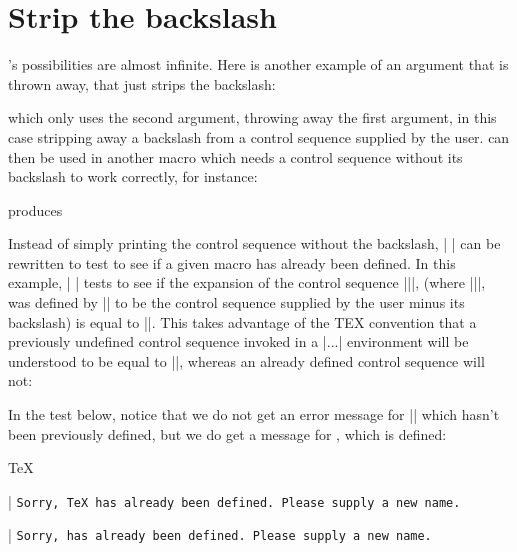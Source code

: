 \section*{Strip the backslash}

\tex's possibilities are almost infinite. Here is another example of
an argument that is thrown away\cite{amy1990}, that just strips the backslash:

\def\stripbackslash#1#2*{\def\one{#2}}

which only uses the second argument, throwing away the
first argument, in this case stripping away a backslash
from a control sequence supplied by the user. 
can then be used in another macro which
needs a control sequence without its backslash to work
correctly, for instance:

\def\newdef#1{\expandafter
\stripbackslash\string#1* \one}



\newdef\testmacro

produces

\newdef\testmacro


Instead of simply printing the control sequence without
the backslash, |\newdef| can be rewritten to test to see
if a given macro has already been defined. In this example,
|\newdef| tests to see if the expansion of the control
sequence |\csname\one\endcsname|, (where |\one|,
was defined by |\stripbackslash| to be the control sequence
supplied by the user minus its backslash) is equal
to |\relax|. This takes advantage of the TEX convention
that a previously undefined control sequence invoked in
a |\csname...\endcsname| environment will be understood
to be equal to |\relax|, whereas an already defined
control sequence will not:


\def\newdef#1{%
\expandafter\stripbackslash\string#1*
\expandafter
\ifx\csname\one\endcsname\relax
\else %
{\tt Sorry, \string#1 has already been
defined. Please supply a new name.}
\fi}

In the test below, notice that we do not get an error message
for |\cactus| which hasn’t been previously defined,
but we do get a message for \tex, which is defined:

\newdef\TeX
\newdef\cactus

\def\newdef#1{%
\expandafter\stripbackslash\string#1*
\expandafter
\ifx\csname\one\endcsname\relax
\parbox{3.8cm}{\texttt{\textbackslash \one \hfill : }}\parbox{5cm}{~~\texttt{Not defined}}
\else %
{\reflect{#1}}
\fi}

